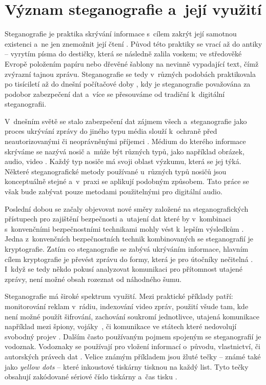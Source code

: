 \section{Význam steganografie a~její využití}
\label{sec:motivation-and-uses}

Steganografie je praktika skrývání informace s~cílem zakrýt její samotnou
existenci a~ne jen znemožnit její čtení
\cite{AlSabhany2020}\cite{Anderson1998}\cite{Djebbar2012}\cite{Dutta2020}.
Původ této praktiky se vrací až do antiky -- vyrytím písma do destičky, která
se následně zalila voskem; ve středověké Evropě položením papíru nebo dřevěné
šablony na nevinně vypadající text, čímž zvýrazní tajnou zprávu. Steganografie
se tedy v~různých podobách praktikovala po tisíciletí až do dnešní počítačové
doby \cite{Anderson1998}, kdy je steganografie považována za podobor
zabezpečení dat \cite{Djebbar2012} a~více se přesouváme od tradiční k~digitální
steganografii.

V~dnešním světě se stalo zabezpečení dat zájmem všech a~steganografie jako
proces ukrývání zprávy do jiného typu média slouží k~ochraně před
neautorizovanými či neoprávněnými příjemci \cite{Dutta2020}. Médium do kterého
informace skrýváme se nazývá nosič a~může být různých typů, jako například
obrázek, audio, video \cite{Dutta2020}. Každý typ nosiče má svoji oblast
výzkumu, která se jej týká. Některé steganografické metody používané u~různých
typů nosičů jsou konceptuálně stejné a~v~praxi se aplikují podobným způsobem.
Tato práce se však bude zabývat pouze metodami použitelnými pro digitální
audio.

Poslední dobou se začaly objevovat nové směry založené na steganografických
přístupech pro zajištění bezpečnosti a~utajení dat které by v~kombinaci
s~konvenčními bezpečnostními technikami mohly vést k~lepším výsledkům
\cite{Djebbar2012}. Jedna z~konvenčních bezpečnostních technik kombinovaných se
steganografií je kryptografie. Zatím co steganografie se zabývá ukrýváním
informace, hlavním cílem kryptografie je převést zprávu do formy, která je pro
útočníky nečitelná \cite{AlSabhany2020}. I~když se tedy někdo pokusí analyzovat
komunikaci pro přítomnost utajené zprávy, není možné obsah rozeznat od
náhodného šumu.

Steganografie má široké spektrum využití. Mezi praktické příklady patří:
monitorování reklam v~rádiu, indexování video zpráv, použití všude tam, kde
není možné použít šifrování, zachování soukromí jednotlivce, utajená komunikace
například mezi špiony, vojáky~\cite{Dutta2020}, či komunikace ve státech které
nedovolují svobodný projev \cite{Anderson1998}. Dalším často používaným pojmem
spojeným se steganografií je vodoznak. Vodoznaky se používají pro vložení
informací o~původu, vlastnictví, či autorských právech dat
\cite{Anderson1998}\cite{Djebbar2012}\cite{Dutta2020}. Velice známým příkladem
jsou žluté tečky -- známé také jako \textit{yellow dots} -- které inkoustové
tiskárny tisknou na každý list. Tyto tečky obsahují zakódované sériové číslo
tiskárny a~čas tisku \cite{Dutta2020}.

